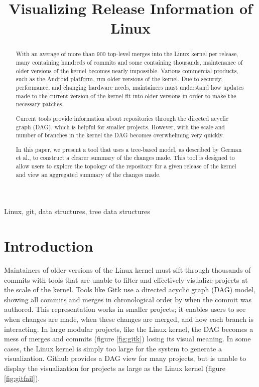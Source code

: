 \documentclass[conference, draftclsnofoot, draft]{IEEEtran}
\makeatletter
\newcommand{\TheTitle}{Visualizing Release Information of Linux}
\newcommand{\TheAuthors}{Evan Wilde}
\newcommand{\TheEmails}{etcwilde@uvic.ca}
\newcommand{\TheKeywords}{Linux, git, data structures, tree data structures}
\makeatother
\begin{document}
\title{\TheTitle}
\author{
\IEEEauthorblockA{\TheAuthors}
\IEEEauthorblockA{Email: \TheEmails}
}
\maketitle
\begin{abstract}

        With an average of more than 900 top-level merges into the Linux kernel per
        release, many containing hundreds of commits and some containing thousands,
        maintenance of older versions of the kernel becomes nearly impossible.
        Various commercial products, such as the Android platform, run older
        versions of the kernel. Due to security, performance, and changing hardware
        needs, maintainers must understand how updates made to the current version
        of the kernel fit into older versions in order to make the necessary
        patches.

        Current tools provide information about repositories through the directed
        acyclic graph (DAG), which is helpful for smaller projects. However, with
        the scale and number of branches in the kernel the DAG becomes overwhelming
        very quickly.

        In this paper, we present a tool that uses a tree-based model, as described
        by German et al., to construct a clearer summary of the changes made. This
        tool is designed to allow users to explore the topology of the repository
        for a given release of the kernel and view an aggregated summary of the
        changes made.

\end{abstract}

\begin{IEEEkeywords}
\TheKeywords
\end{IEEEkeywords}

\section{Introduction}

Maintainers of older versions of the Linux kernel must sift through thousands of
commits with tools that are unable to filter and effectively visualize projects at
the scale of the kernel. Tools like Gitk use a directed acyclic graph (DAG) model,
showing all commits and merges in chronological order by when the commit was
authored. This representation works in smaller projects; it enables users to see
when changes are made, when these changes are merged, and how each branch is
interacting.  In large modular projects, like the Linux kernel, the DAG becomes a
mess of merges and commits (figure \ref{fig:gitk}) losing its visual meaning. In
some cases, the Linux kernel is simply too large for the system to generate a
visualization. Github provides a DAG view for many projects, but is unable to
display the visualization for projects as large as the Linux kernel (figure
\ref{fig:gitfail}).
\end{document}
